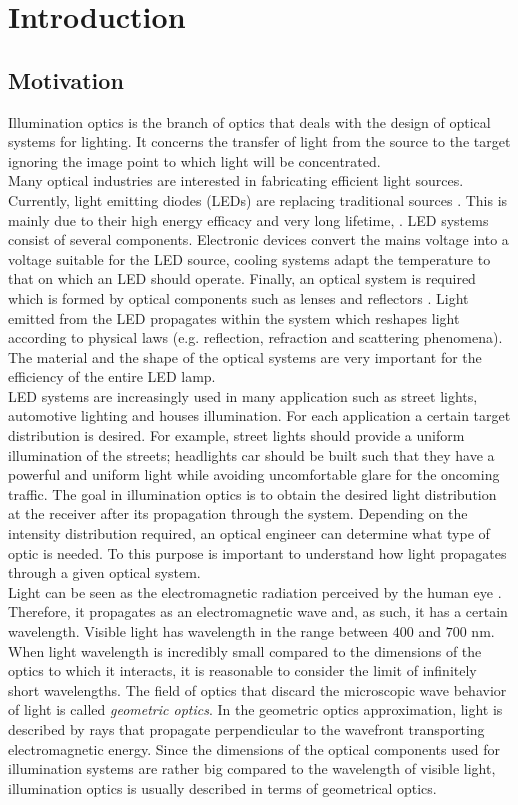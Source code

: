 \chapter{Introduction}
\section{Motivation}
Illumination optics is the branch of optics that deals with the design of optical systems for lighting. It concerns the transfer of light from the source to the target ignoring the image point to which light will be concentrated. \\ \indent 
Many optical industries are interested in fabricating efficient light sources.
Currently, light emitting
diodes (LEDs) are replacing traditional sources \cite{koshel2012illumination}. 
This is mainly due to their high energy efficacy and very long lifetime, \cite{taguchi2008present, haitz2011solid}. 
LED systems consist of several components. 
Electronic devices convert the mains voltage into a voltage suitable for the LED source, cooling systems adapt the temperature to that on which an LED should operate.
Finally, an optical system is required which is formed by optical components such as lenses and reflectors \cite{moreno2008modeling}. Light emitted from the LED propagates within the system which reshapes light according to physical laws (e.g. reflection, refraction and scattering phenomena). The material and the shape of the optical systems are very important for the efficiency of the entire LED lamp. \\ \indent LED systems are increasingly used in many application such as street lights, automotive lighting and houses illumination. For each application a certain target distribution is desired. For example, street lights should provide a uniform illumination of the streets; headlights car should be built such that they have a powerful and uniform light while avoiding uncomfortable glare for the oncoming traffic.
The goal in illumination optics is to obtain the desired light distribution at the receiver after its propagation through the system. Depending on the intensity distribution required, an optical engineer can determine what type of optic is needed. To this purpose is important to understand how light propagates through a given optical system. \\ \indent
Light can be seen as the electromagnetic radiation perceived by the human eye \cite{schreuder2008outdoor}. Therefore, it propagates as an electromagnetic wave and, as such, it has a certain wavelength. Visible light has wavelength in the range between $400$ and $700$ nm. When light wavelength is incredibly small compared to the dimensions of the optics to which it interacts, it is reasonable to consider the limit of infinitely short wavelengths. The field of optics that discard the microscopic wave behavior of light is called \textit{geometric optics}. In the geometric optics approximation, light is described by rays that propagate perpendicular to the wavefront transporting electromagnetic energy. Since the dimensions of the optical components used for illumination systems are rather big compared to the wavelength of visible light, illumination optics is usually described in terms of geometrical optics. 
